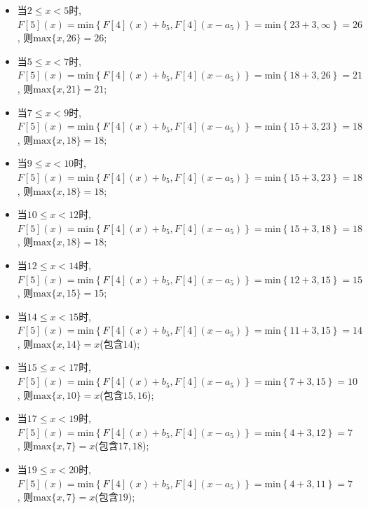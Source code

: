 \documentclass{article}
\begin{document}
\begin{homeworkProblem}
\begin{itemize}
\begin{itemize}
			\item 当$2\leq x<5$时, $F\left[ 5 \right] \left( x \right) =\text{min} \left\{ F\left[ 4 \right] \left( x \right) +b_5,F\left[ 4 \right] \left( x-a_5 \right) \right\} =\text{min} \left\{ 23+3,\infty \right\} =26$, 则$\text{max}\{x,26\}=26$;
			\item 当$5\leq x<7$时, $F\left[ 5 \right] \left( x \right) =\text{min} \left\{ F\left[ 4 \right] \left( x \right) +b_5,F\left[ 4 \right] \left( x-a_5 \right) \right\} =\text{min} \left\{ 18+3,26 \right\} =21$, 则$\text{max}\{x,21\}=21$;
			\item 当$7\leq x<9$时, $F\left[ 5 \right] \left( x \right) =\text{min} \left\{ F\left[ 4 \right] \left( x \right) +b_5,F\left[ 4 \right] \left( x-a_5 \right) \right\} =\text{min} \left\{ 15+3,23 \right\} =18$, 则$\text{max}\{x,18\}=18$;
			\item 当$9\leq x<10$时, $F\left[ 5 \right] \left( x \right) =\text{min} \left\{ F\left[ 4 \right] \left( x \right) +b_5,F\left[ 4 \right] \left( x-a_5 \right) \right\} =\text{min} \left\{ 15+3,23 \right\} =18$, 则$\text{max}\{x,18\}=18$;
			\item 当$10\leq x<12$时, $F\left[ 5 \right] \left( x \right) =\text{min} \left\{ F\left[ 4 \right] \left( x \right) +b_5,F\left[ 4 \right] \left( x-a_5 \right) \right\} =\text{min} \left\{ 15+3,18 \right\} =18$, 则$\text{max}\{x,18\}=18$;
			\item 当$12\leq x<14$时, $F\left[ 5 \right] \left( x \right) =\text{min} \left\{ F\left[ 4 \right] \left( x \right) +b_5,F\left[ 4 \right] \left( x-a_5 \right) \right\} =\text{min} \left\{ 12+3,15 \right\} =15$, 则$\text{max}\{x,15\}=15$;
			\item 当$14\leq x<15$时, $F\left[ 5 \right] \left( x \right) =\text{min} \left\{ F\left[ 4 \right] \left( x \right) +b_5,F\left[ 4 \right] \left( x-a_5 \right) \right\} =\text{min} \left\{ 11+3,15 \right\} =14$, 则$\text{max}\{x,14\}=x$(包含$14$);
			\item 当$15\leq x<17$时, $F\left[ 5 \right] \left( x \right) =\text{min} \left\{ F\left[ 4 \right] \left( x \right) +b_5,F\left[ 4 \right] \left( x-a_5 \right) \right\} =\text{min} \left\{ 7+3,15 \right\} =10$, 则$\text{max}\{x,10\}=x$(包含$15,16$);
			\item 当$17\leq x<19$时, $F\left[ 5 \right] \left( x \right) =\text{min} \left\{ F\left[ 4 \right] \left( x \right) +b_5,F\left[ 4 \right] \left( x-a_5 \right) \right\} =\text{min} \left\{ 4+3,12 \right\} =7$, 则$\text{max}\{x,7\}=x$(包含$17,18$);
			\item 当$19\leq x<20$时, $F\left[ 5 \right] \left( x \right) =\text{min} \left\{ F\left[ 4 \right] \left( x \right) +b_5,F\left[ 4 \right] \left( x-a_5 \right) \right\} =\text{min} \left\{ 4+3,11 \right\} =7$, 则$\text{max}\{x,7\}=x$(包含$19$);

\end{itemize}
\end{itemize}
\end{homeworkProblem}
\end{document}
